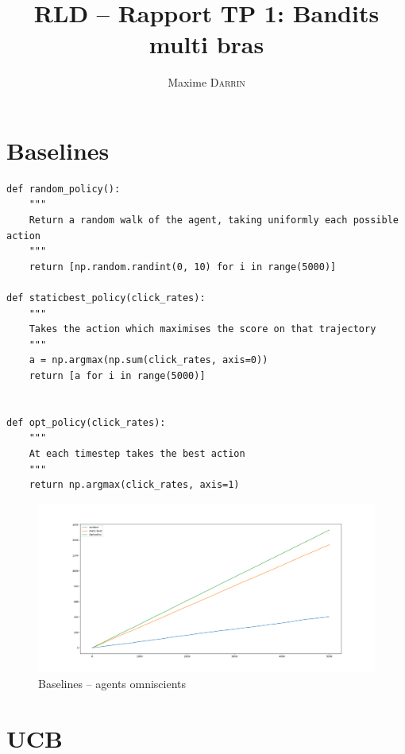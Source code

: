 \documentclass[french]{article}
\title{RLD -- Rapport TP 1: Bandits multi bras}
\author{Maxime \textsc{Darrin}}
\begin{document}
	\maketitle
	
	\section{Baselines}
	
	\begin{verbatim}
def random_policy():
	"""
	Return a random walk of the agent, taking uniformly each possible action
	"""
	return [np.random.randint(0, 10) for i in range(5000)]		
		
def staticbest_policy(click_rates):
	"""
	Takes the action which maximises the score on that trajectory
	"""
	a = np.argmax(np.sum(click_rates, axis=0))
	return [a for i in range(5000)]
		
		
def opt_policy(click_rates):
	"""
	At each timestep takes the best action
	"""
	return np.argmax(click_rates, axis=1)
	\end{verbatim}
	
	\begin{figure}[H]
		\centering
		\includegraphics[scale=0.3]{img/baselines.png}
		\caption{Baselines -- agents omniscients}
	\end{figure}
	
	\section{UCB}
	
\end{document}
